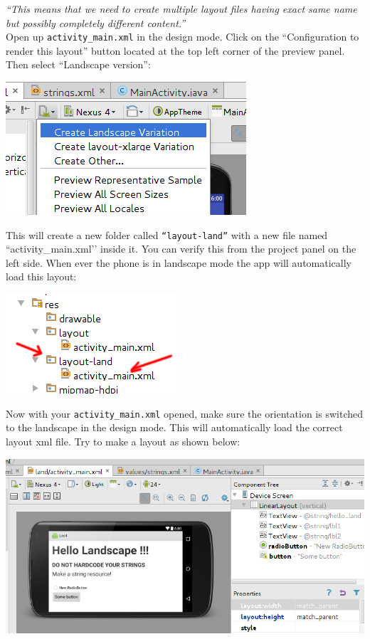 \textit{``This means that we need to create multiple layout files having exact same name but possibly completely different content.''} \\

Open up \texttt{activity\_main.xml} in the design mode. Click on the ``Configuration to render this layout'' button located at the top left corner of the preview panel. Then select ``Landscape version'':

\begin{center}
	\includegraphics[scale=0.4]{chapters/ch04/images/25}
\end{center}

This will create a new folder called \texttt{``layout-land''} with a new file named {``activity\_main.xml'}' inside it. You can verify this from the project panel on the left side. When ever the phone is in landscape mode the app will automatically load this layout:

\begin{center}
	\includegraphics[scale=0.4]{chapters/ch04/images/26}
\end{center}

Now with your \texttt{activity\_main.xml} opened, make sure the orientation is switched to the landscape in the design mode. This will automatically load the correct layout xml file. Try to make a layout as shown below:

\begin{center}
	\includegraphics[scale=0.4]{chapters/ch04/images/27}
\end{center}

